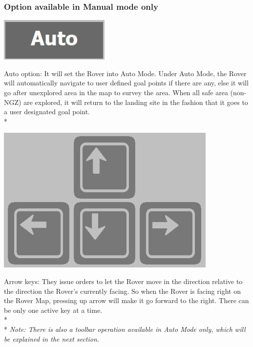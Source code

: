 \documentclass[12pt]{article}
\begin{document}
	\subsubsection{Option available in Manual mode only}
		\begin{center}
		\includegraphics[scale = 1]{Auto.jpg}
		\end{center}	
Auto option: It will set the Rover into Auto Mode. Under Auto Mode, the Rover will automatically navigate to user defined goal points if there are any, else it will go after unexplored area in the map to survey the area. When all safe area (non-NGZ) are explored, it will return to the landing site in the fashion that it goes to a user designated goal point.
\\*
		\begin{center}
		\includegraphics[scale = 1]{Arrows.jpg}
		\end{center}	
Arrow keys: They issue orders to let the Rover move in the direction relative to the direction the Rover’s currently facing. So when the Rover is facing right on the Rover Map, pressing up arrow will make it go forward to the right. There can be only one active key at a time.
\\*
\\*
\textit{Note: There is also a toolbar operation available in Auto Mode only, which will be explained in the next section.}

		
\end{document}
